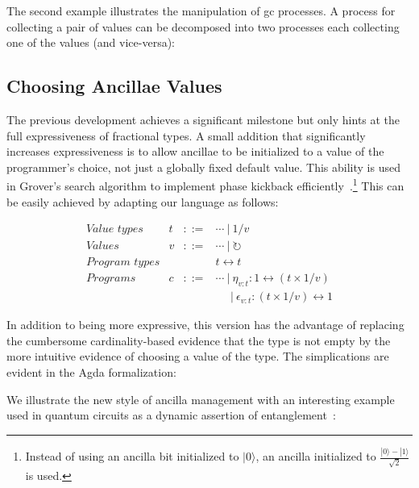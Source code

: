 \documentclass[sigplan,10pt,review,anonymous]{acmart}
\newcommand{\alt}{~|~}
\newcommand{\gcv}{\circlearrowright}
\newcommand{\ket}[1]{|#1\rangle}
\newcommand{\oneover}[1]{1/#1}
\begin{document}
The second example illustrates the manipulation of gc processes. A
process for collecting a pair of values can be decomposed into two
processes each collecting one of the values (and vice-versa):

\EtaEpsilonExampletwo{}

\subsection{Choosing Ancillae Values}

The previous development achieves a significant milestone but only
hints at the full expressiveness of fractional types. A small addition
that significantly increases expressiveness is to allow ancillae to be
initialized to a value of the programmer's choice, not just a globally
fixed default value. This ability is used in Grover's search algorithm
to implement phase kickback
efficiently~\cite{howgrover}.\footnote{Instead of using an ancilla bit
  initialized to $\ket{0}$, an ancilla initialized to
  $\frac{\ket{0}-\ket{1}}{\sqrt{2}}$ is used.} This can be easily
achieved by adapting our language as follows:

\[\begin{array}{lrcl}
\textit{Value types} & t &::=& \cdots \alt \oneover{v} \\
\textit{Values}      & v &::=& \cdots \alt \gcv \\
\textit{Program types} &&& t \leftrightarrow t \\
\textit{Programs} & c &::=& \cdots \alt
   \eta_{v:t} : 1 \leftrightarrow (t \times \oneover{v}) \\
   &&& ~~~~~\alt \epsilon_{v:t} : (t \times \oneover{v}) \leftrightarrow 1 
\end{array}\]

In addition to being more expressive, this version has the advantage
of replacing the cumbersome cardinality-based evidence that the type
is not empty by the more intuitive evidence of choosing a value of the
type. The simplications are evident in the Agda formalization:

\PIFDUdef{}

\vspace{-\baselineskip}

\PIFDCombdef{}

\vspace{-\baselineskip}

\PIFDinterp{}

We illustrate the new style of ancilla management with an interesting
example used in quantum circuits as a dynamic assertion of
entanglement~\cite{DBLP:journals/cal/ZhouB19}:
\end{document}
